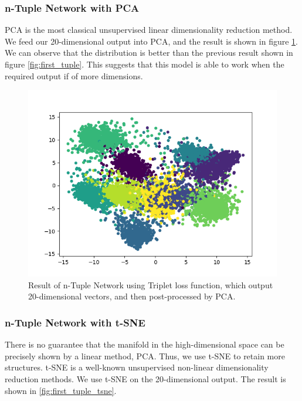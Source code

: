 \documentclass[10pt,twocolumn,letterpaper]{article}
\begin{document}
		\subsubsection{n-Tuple Network with PCA}
			PCA is the most classical unsupervised linear dimensionality reduction method. We feed our 20-dimensional output into PCA, and the result is shown in figure \ref{fig:first_tuple_pca}. We can observe that the distribution is better than the previous result shown in figure \ref{fig:first_tuple}. This suggests that this model is able to work when the required output if of more dimensions. 
			
			\begin{figure}[htbp]
				\begin{center}
					\includegraphics[width=0.9\linewidth]{first_tuple_pca}
				\end{center}
				\caption{Result of n-Tuple Network using Triplet loss function, which output 20-dimensional vectors, and then post-processed by PCA.\label{fig:first_tuple_pca}}
			\end{figure}
		\subsubsection{n-Tuple Network with t-SNE}
			There is no guarantee that the manifold in the high-dimensional space can be precisely shown by a linear method, PCA. Thus, we use t-SNE to retain more structures. t-SNE \cite{bengio2009learning} is a well-known unsupervised non-linear dimensionality reduction methods. We use t-SNE on the 20-dimensional output. The result is shown in \ref{fig:first_tuple_tsne}.
			
\end{document}
